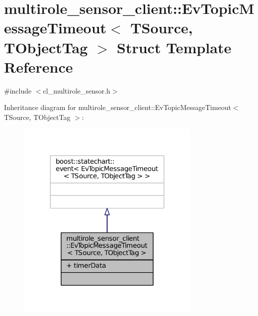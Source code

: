\hypertarget{structmultirole__sensor__client_1_1EvTopicMessageTimeout}{}\section{multirole\+\_\+sensor\+\_\+client\+:\+:Ev\+Topic\+Message\+Timeout$<$ T\+Source, T\+Object\+Tag $>$ Struct Template Reference}
\label{structmultirole__sensor__client_1_1EvTopicMessageTimeout}


{\ttfamily \#include $<$cl\+\_\+multirole\+\_\+sensor.\+h$>$}



Inheritance diagram for multirole\+\_\+sensor\+\_\+client\+:\+:Ev\+Topic\+Message\+Timeout$<$ T\+Source, T\+Object\+Tag $>$\+:
\nopagebreak
\begin{figure}[H]
\begin{center}
\leavevmode
\includegraphics[width=251pt]{structmultirole__sensor__client_1_1EvTopicMessageTimeout__inherit__graph}
\end{center}
\end{figure}


